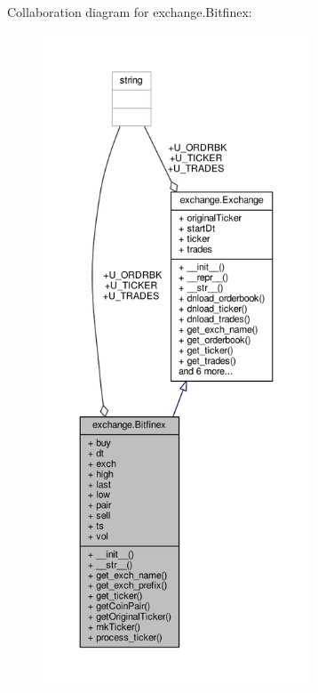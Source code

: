 Collaboration diagram for exchange.\+Bitfinex\+:
\nopagebreak
\begin{figure}[H]
\begin{center}
\leavevmode
\includegraphics[height=550pt]{classexchange_1_1_bitfinex__coll__graph}
\end{center}
\end{figure}

